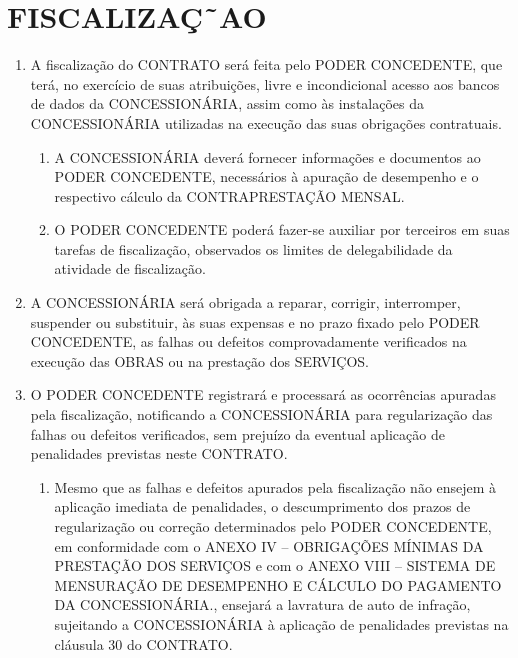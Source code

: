 \documentclass[a4paper,11pt]{report} %
\begin{document}
\section{FISCALIZAÇ˜AO}
\label{sec:Q67R}

\begin{enumerate}
\item \label{itm:PSQ2} A fiscalização do CONTRATO será feita pelo PODER CONCEDENTE, que terá, no exercício de suas atribuições, livre e incondicional acesso aos bancos de dados da CONCESSIONÁRIA, assim como às instalações da CONCESSIONÁRIA utilizadas na execução das suas obrigações contratuais.

\begin{enumerate}[label*=\arabic*.]
\item \label{itm:QU65} A CONCESSIONÁRIA deverá fornecer informações e documentos ao PODER CONCEDENTE, necessários à apuração de desempenho e o respectivo cálculo da CONTRAPRESTAÇÃO MENSAL.

\item \label{itm:WPGV} O PODER CONCEDENTE poderá fazer-se auxiliar por terceiros em suas tarefas de fiscalização, observados os limites de delegabilidade da atividade de fiscalização.
\end{enumerate}

\item \label{itm:WE6D} A CONCESSIONÁRIA será obrigada a reparar, corrigir, interromper, suspender ou substituir, às suas expensas e no prazo fixado pelo PODER CONCEDENTE, as falhas ou defeitos comprovadamente verificados na execução das OBRAS ou na prestação dos SERVIÇOS.

\item \label{itm:PX35} O PODER CONCEDENTE registrará e processará as ocorrências apuradas pela fiscalização, notificando a CONCESSIONÁRIA para regularização das falhas ou defeitos verificados, sem prejuízo da eventual aplicação de penalidades previstas neste CONTRATO.

\begin{enumerate}[label*=\arabic*.]
\item \label{itm:X2AA} Mesmo que as falhas e defeitos apurados pela fiscalização não ensejem à aplicação imediata de penalidades, o descumprimento dos prazos de regularização ou correção determinados pelo PODER CONCEDENTE, em conformidade com o ANEXO IV – OBRIGAÇÕES MÍNIMAS DA PRESTAÇÃO DOS SERVIÇOS e com o ANEXO VIII – SISTEMA DE MENSURAÇÃO DE DESEMPENHO E CÁLCULO DO PAGAMENTO DA CONCESSIONÁRIA., ensejará a lavratura de auto de infração, sujeitando a CONCESSIONÁRIA à aplicação de penalidades previstas na cláusula 30 do CONTRATO.


\end{enumerate}
\end{enumerate}
\end{document}
